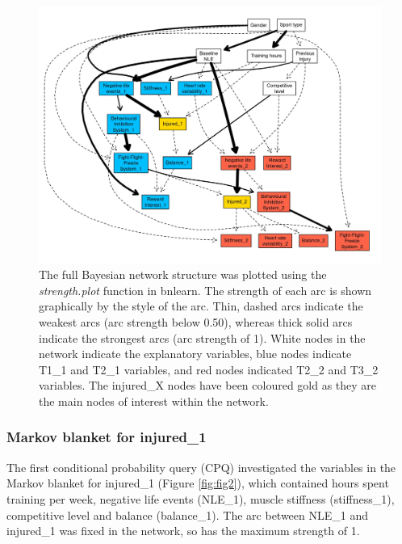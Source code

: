 \documentclass[
  english,
  man]{apa6}
\begin{document}
\begin{figure}
\centering
\includegraphics{figures_doc/Fig1.jpeg}
\caption{\label{fig:fig1}The full Bayesian network structure was plotted using the \emph{strength.plot} function in bnlearn. The strength of each arc is shown graphically by the style of the arc. Thin, dashed arcs indicate the weakest arcs (arc strength below 0.50), whereas thick solid arcs indicate the strongest arcs (arc strength of 1). White nodes in the network indicate the explanatory variables, blue nodes indicate T1\_1 and T2\_1 variables, and red nodes indicated T2\_2 and T3\_2 variables. The injured\_X nodes have been coloured gold as they are the main nodes of interest within the network.}
\end{figure}

\hypertarget{markov-blanket-for-injured_1}{%
\subsubsection{Markov blanket for injured\_1}\label{markov-blanket-for-injured_1}}

The first conditional probability query (CPQ) investigated the variables in the Markov blanket for injured\_1 (Figure \ref{fig:fig2}), which contained hours spent training per week, negative life events (NLE\_1), muscle stiffness (stiffness\_1), competitive level and balance (balance\_1).
The arc between NLE\_1 and injured\_1 was fixed in the network, so has the maximum strength of 1.
\end{document}
